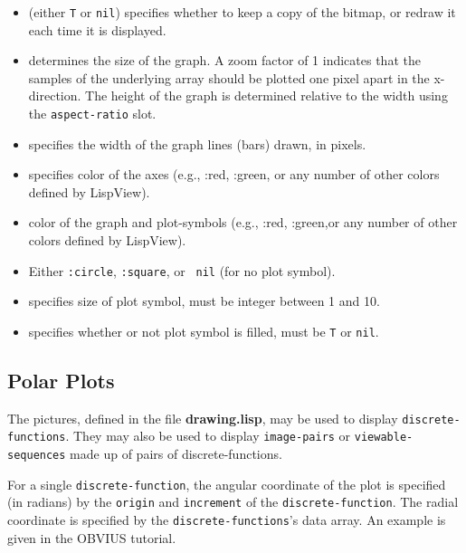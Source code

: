 \begin{itemize}
\item {} (either {\tt T} or {\tt nil}) specifies
whether to keep a copy of the bitmap, or redraw it each time it is
displayed.

\item {} determines the size of the graph.  A zoom factor of
1 indicates that the samples of the underlying array should be plotted
one pixel apart in the x-direction.  The height of the graph is
determined relative to the width using the {\tt aspect-ratio} slot.

\item {} specifies the width of the graph lines (bars)
drawn, in pixels.

\item {} specifies color of the axes (e.g., :red,
:green, or any number of other colors defined by LispView).

\item {} color of the graph and plot-symbols (e.g., :red,
:green,or any number of other colors defined by LispView).

\item {} Either {\tt :circle}, {\tt :square}, or {\tt
nil} (for no plot symbol).

\item {} specifies size of plot symbol, must be
integer between 1 and 10.

\item {} specifies whether or not plot symbol is
filled, must be {\tt T} or {\tt nil}.
\end{itemize}


\subsection{Polar Plots}
\label{sec:polar-plots}

The  pictures, defined in the file {\bf drawing.lisp},
may be used to display {\tt discrete-functions}.  They may also be
used to display {\tt image-pairs} or {\tt viewable-sequences} made up
of pairs of discrete-functions.  

For a single {\tt discrete-function}, the angular coordinate of the
plot is specified (in radians) by the {\tt origin} and {\tt increment}
of the {\tt discrete-function}.  The radial coordinate is specified by
the {\tt discrete-functions}'s data array.  An example is given in the
OBVIUS tutorial.

